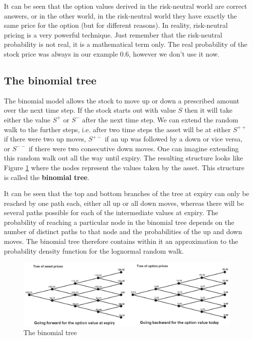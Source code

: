 It can be seen that the option values derived in the risk-neutral world are correct answers, or in the other world, in the risk-neutral world they have exactly the same price for the option (but for different reasons). In reality, risk-neutral pricing is a very powerful technique. Just remember that the risk-neutral probability is not real, it is a mathematical term only. The real probability of the stock price was always in our example 0.6, however we don't use it now. 


\subsection{The binomial tree}
The binomial model allows the stock to move up or down a prescribed amount over the next time step. If the stock starts out with value $S$ then it will take either the value $S^+$ or $S^-$ after the next time step. We can extend the random walk to the further steps, i.e. after two time steps the asset will be at either $S^{++}$ if there were two up moves, $S^{+-}$ if an up was followed by a down or vice versa, or $S^{--}$ if there were two consecutive down moves. One can imagine extending this random walk out all the way until expiry. The resulting structure looks like Figure \ref{fig:binomial_tree} where the nodes represent the values taken by the asset. This structure is called the \textbf{binomial tree}. 

It can be seen that the top and bottom branches of the tree at expiry can only be reached by one path each, either all up or all down moves, whereas there will be several paths possible for each of the intermediate values at expiry. The probability of reaching a particular node in the binomial tree depends on the number of distinct paths to that node and the probabilities of the up and down moves. The binomial tree therefore contains within it an approximation to the probability density function for the lognormal random walk. 

\begin{figure}[H]
    \centering
    \includegraphics[width=\textwidth]{figure/binomial_tree.png} 
    \caption{The binomial tree}
    \label{fig:binomial_tree}
\end{figure}

